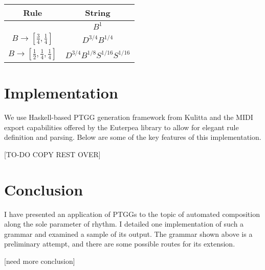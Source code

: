 \documentclass{article}
\begin{document}
\begin{center}
\begin{tabular}{ c c }
 Rule & String \\
 \hline
 $ $ & $B^{1}$ \\
 $B \rightarrow [\frac{3}{4}, \frac{1}{4}]$              & $D^{3/4} B^{1/4}$ \\
 $B \rightarrow [\frac{1}{2}, \frac{1}{4}, \frac{1}{4}]$ & $D^{3/4} B^{1/8} S^{1/16} S^{1/16}$
\end{tabular}
\end{center}

\section{Implementation}

We use Haskell-based PTGG generation framework from Kulitta and the MIDI export capabilities offered by the Euterpea library \cite{euterpea} to allow for elegant rule definition and parsing. Below are some of the key features of this implementation.

[TO-DO COPY REST OVER]


\section{Conclusion}

I have presented an application of PTGGs to the topic of automated composition along the sole parameter of rhythm. I detailed one implementation of such a grammar and examined a sample of its output. The grammar shown above is a preliminary attempt, and there are some possible routes for its extension. 

[need more conclusion]
\end{document}
